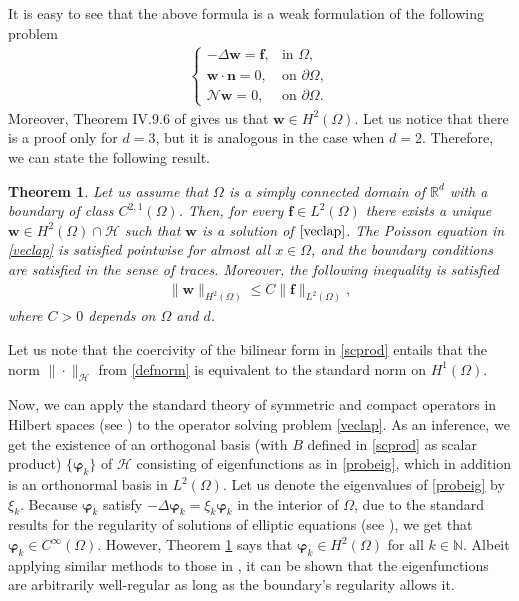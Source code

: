 \documentclass[11pt]{article}
\numberwithin{equation}{section}
\theoremstyle{plain}
\newtheorem{tw}[defi]{Theorem}
\newcommand\bb[1]{\mathbf{#1}}
\newcommand{\n}{\mathbb{N}}
\newcommand{\rn}{\mathbb{R}^d}
\newcommand{\tn}{\Omega}
\newcommand{\htwo}{H^2(\Omega)}
\renewcommand{\hom}{H^1(\tn)}
\newcommand{\ld}{L^2(\Omega)}
\let \phi\varphi
\newcommand{\bs}[1]{\boldsymbol{#1}}
\newcommand{\N}{\mathcal{N}}
\renewcommand{\H}{\mathcal{H}}
\begin{document}
It is easy to see that the above formula is a weak formulation of the following problem
\begin{align}\label{veclap}
\begin{cases}
-\Delta\bb w=\bb f, & \textrm{in } \Omega,\\
\bb w\cdot\bb n=0, & \textrm{on } \partial\Omega,\\
\N\bb w=0, & \textrm{on } \partial\Omega. 
\end{cases}
\end{align}
Moreover, Theorem IV.9.6 of \cite{Boyer} gives us that $\bb w\in\htwo$. Let us notice that there is a proof only for $d=3$, but it is analogous in the case when $d=2$. Therefore, we can state the following result.
\begin{tw}\label{prexpr}
Let us assume that $\tn$ is a simply connected domain of $\rn$ with a boundary of class $C^{2,1}(\tn)$. Then, for every $\bb f\in\ld$ there exists a unique $\bb w\in\htwo\cap\H$ such that $\bb w$ is a solution of $\eqref{veclap}$. The Poisson equation in \eqref{veclap} is satisfied pointwise for almost all $x\in\Omega$, and the boundary conditions are satisfied in the sense of traces. Moreover, the following inequality is satisfied
\begin{align*}
\|\bb w\|_{\htwo}\leq C\|\bb f\|_{\ld},
\end{align*}
where $C>0$ depends on $\Omega$ and $d$.
\end{tw}
Let us note that the coercivity of the bilinear form in \eqref{scprod} entails that the norm $\|\cdot\|_{\H}$ from \eqref{defnorm} is equivalent to the standard norm on $\hom$.
 
Now, we can apply the standard theory of symmetric and compact operators in Hilbert spaces (see \cite[Theorem 7 of Appendix D]{Evans}) to the operator solving problem \eqref{veclap}. As an inference, we get the existence of an orthogonal basis (with $B$ defined in \eqref{scprod} as scalar product) $\{\bs\phi_k\}$ of $\H$ consisting of eigenfunctions as in \eqref{probeig}, which in addition is an orthonormal basis in $\ld$. Let us denote the eigenvalues of \eqref{probeig} by $\xi_k$. Because $\bs\phi_k$ satisfy $-\Delta\bs\phi_k=\xi_k\bs\phi_k$ in the interior of $\Omega$, due to the standard results for the regularity of solutions of elliptic equations (see \cite{Boyer, Evans}), we get that $\bs\phi_k\in C^{\infty}(\Omega)$. However, Theorem \ref{prexpr} says that $\bs\phi_k\in\htwo$ for all $k\in\n$. Albeit applying similar methods to those in \cite{Boyer}, it can be shown that the eigenfunctions are arbitrarily well-regular as long as the boundary's regularity allows it.
\end{document}
